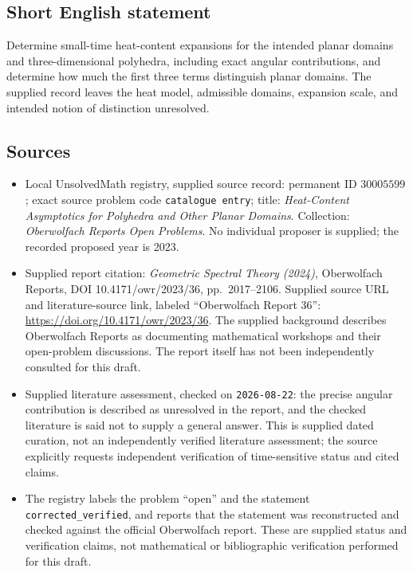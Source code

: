 \documentclass[11pt]{article}
\begin{document}
\subsection{Short English statement}
Determine small-time heat-content expansions for the intended planar domains and three-dimensional polyhedra, including exact angular contributions, and determine how much the first three terms distinguish planar domains. The supplied record leaves the heat model, admissible domains, expansion scale, and intended notion of distinction unresolved.
\subsection{Sources}
\begin{itemize}
\item Local UnsolvedMath registry, supplied source record: permanent ID \(30005599\); exact source problem code \texttt{catalogue entry}; title: \emph{Heat-Content Asymptotics for Polyhedra and Other Planar Domains}. Collection: \emph{Oberwolfach Reports Open Problems}. No individual proposer is supplied; the recorded proposed year is 2023.
\item Supplied report citation: \emph{Geometric Spectral Theory (2024)}, Oberwolfach Reports, DOI 10.4171/owr/2023/36, pp.\ 2017--2106. Supplied source URL and literature-source link, labeled ``Oberwolfach Report 36'': \url{https://doi.org/10.4171/owr/2023/36}. The supplied background describes Oberwolfach Reports as documenting mathematical workshops and their open-problem discussions. The report itself has not been independently consulted for this draft.
\item Supplied literature assessment, checked on \texttt{2026-08-22}: the precise angular contribution is described as unresolved in the report, and the checked literature is said not to supply a general answer. This is supplied dated curation, not an independently verified literature assessment; the source explicitly requests independent verification of time-sensitive status and cited claims.
\item The registry labels the problem ``open'' and the statement \texttt{corrected\_verified}, and reports that the statement was reconstructed and checked against the official Oberwolfach report. These are supplied status and verification claims, not mathematical or bibliographic verification performed for this draft.
\end{itemize}
\end{document}
